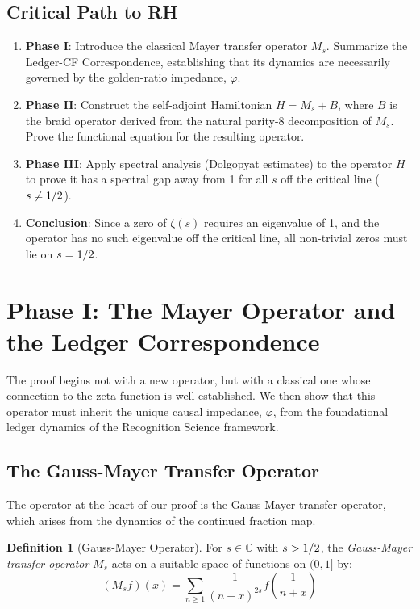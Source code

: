 \documentclass[11pt,a4paper]{article}
\theoremstyle{definition}
\newtheorem{definition}[theorem]{Definition}
\theoremstyle{remark}
\let\Re\relax
\DeclareMathOperator{\Re}{Re}
\begin{document}
\subsection{Critical Path to RH}

\begin{enumerate}
\item \textbf{Phase I}: Introduce the classical Mayer transfer operator $M_s$. Summarize the Ledger-CF Correspondence, establishing that its dynamics are necessarily governed by the golden-ratio impedance, $\varphi$.
\item \textbf{Phase II}: Construct the self-adjoint Hamiltonian $H = M_s + B$, where $B$ is the braid operator derived from the natural parity-8 decomposition of $M_s$. Prove the functional equation for the resulting operator.
\item \textbf{Phase III}: Apply spectral analysis (Dolgopyat estimates) to the operator $H$ to prove it has a spectral gap away from 1 for all $s$ off the critical line ($\Re s \neq 1/2$).
\item \textbf{Conclusion}: Since a zero of $\zeta(s)$ requires an eigenvalue of 1, and the operator has no such eigenvalue off the critical line, all non-trivial zeros must lie on $\Re s = 1/2$.
\end{enumerate}



\section{Phase I: The Mayer Operator and the Ledger Correspondence}\label{sec:phase1}

The proof begins not with a new operator, but with a classical one whose connection to the zeta function is well-established. We then show that this operator must inherit the unique causal impedance, $\varphi$, from the foundational ledger dynamics of the Recognition Science framework.

\subsection{The Gauss-Mayer Transfer Operator}

The operator at the heart of our proof is the Gauss-Mayer transfer operator, which arises from the dynamics of the continued fraction map.

\begin{definition}[Gauss-Mayer Operator]
For $s \in \mathbb{C}$ with $\Re s > 1/2$, the \emph{Gauss-Mayer transfer operator} $M_s$ acts on a suitable space of functions on $(0,1]$ by:
\[
   (M_s f)(x) = \sum_{n\ge1} \frac{1}{(n+x)^{2s}} f\left(\frac{1}{n+x}\right)
\]
\end{definition}
\end{document}
